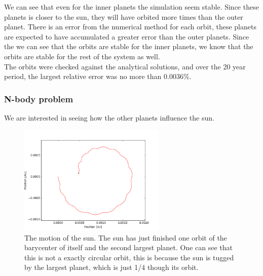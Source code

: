 \documentclass[a4paper, 10pt]{article}
\begin{document}
We can see that even for the inner planets the simulation seem stable. Since these planets is closer to the sun, they will have orbited more times than the outer planet. There is an error from the numerical method for each orbit, these planets are expected to have accumulated a greater error than the outer planets. Since the we can see that the orbits are stable for the inner planets, we know that the orbits are stable for the rest of the system as well.\\

The orbits were checked against the analytical solutions, and over the 20 year period, the largest relative error was no more than $0.0036\%$.


\subsubsection{N-body problem}
We are interested in seeing how the other planets influence the sun.

\begin{figure}[H]
\begin{center}
\includegraphics[width = 70mm]{part2posSun.png}
\caption{The motion of the sun. The sun has just finished one orbit of the barycenter of itself and the second largest planet. One can see that this is not a exactly circular orbit, this is because the sun is tugged by the largest planet, which is just 1/4 though its orbit.}
\end{center}
\end{figure}
\end{document}
